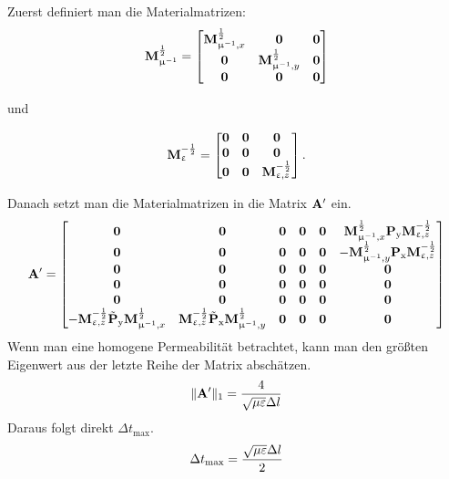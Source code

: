 \documentclass[Protokollheft.tex]{subfiles}
\begin{document}
Zuerst definiert man die Materialmatrizen:
$$\mathbf{M}_{\upmu^{-1}}^\frac12 = \begin{bmatrix}
\mathbf{M}^{\frac12}_{\upmu^{-1},x} & \boldsymbol{0} &\boldsymbol{0}\\
\boldsymbol{0} & \mathbf{M}^{\frac12}_{\upmu^{-1},y} & \boldsymbol{0} \\
\boldsymbol{0} & \boldsymbol{0} & \boldsymbol{0}
\end{bmatrix} $$

und

$$\mathbf{M}_{\upvarepsilon}^{-\frac12} = \begin{bmatrix}
\boldsymbol{0} & \boldsymbol{0} & \boldsymbol{0}\\
\boldsymbol{0} & \boldsymbol{0} & \boldsymbol{0}\\
\boldsymbol{0} & \boldsymbol{0} & \mathbf{M}^{-\frac12}_{\upvarepsilon, z}
\end{bmatrix}.$$

Danach setzt man die Materialmatrizen in die Matrix $ \mathbf{A} '$ ein.
$$ \mathbf{A} '= \begin{bmatrix}
\boldsymbol{0} &\boldsymbol{0} &\boldsymbol{0} &\boldsymbol{0} &\boldsymbol{0} & \mathbf{M}^{\frac12}_{\upmu^{-1},x} \mathbf{P} _\mathrm{y} \mathbf{M}^{-\frac12}_{\upvarepsilon, z}\\
\boldsymbol{0} &\boldsymbol{0} &\boldsymbol{0} &\boldsymbol{0} &\boldsymbol{0} & -\mathbf{M}^{\frac12}_{\upmu^{-1},y} \mathbf{P} _\mathrm{x} \mathbf{M}^{-\frac12}_{\upvarepsilon, z}\\
\boldsymbol{0} &\boldsymbol{0} &\boldsymbol{0} &\boldsymbol{0} &\boldsymbol{0} & \boldsymbol{0}\\
\boldsymbol{0} &\boldsymbol{0} &\boldsymbol{0} &\boldsymbol{0} &\boldsymbol{0} & \boldsymbol{0}\\
\boldsymbol{0} &\boldsymbol{0} &\boldsymbol{0} &\boldsymbol{0} &\boldsymbol{0} & \boldsymbol{0}\\
-\mathbf{M}^{-\frac12}_{\upvarepsilon, z}\tilde{ \mathbf{P} }_\mathrm{y}\mathbf{M}^{\frac12}_{\upmu^{-1},x} & \mathbf{M}^{-\frac12}_{\upvarepsilon, z}\tilde{ \mathbf{P} }_\mathrm{x}\mathbf{M}^{\frac12}_{\upmu^{-1},y} & \boldsymbol{0} &\boldsymbol{0} &\boldsymbol{0} &\boldsymbol{0}
\end{bmatrix}$$
\noindent
Wenn man eine homogene Permeabilität betrachtet, kann man den größten Eigenwert aus der letzte Reihe der Matrix abschätzen.
$$\| \mathbf{A} '\|_1 = \frac{4}{\sqrt{\mu\varepsilon}\Delta l}$$
Daraus folgt direkt $\Delta t_{\text{max}}$.
$$ \Delta t_{\text{max}}=\frac{\sqrt{\mu\varepsilon}\Delta l}{2}$$
\end{document}
